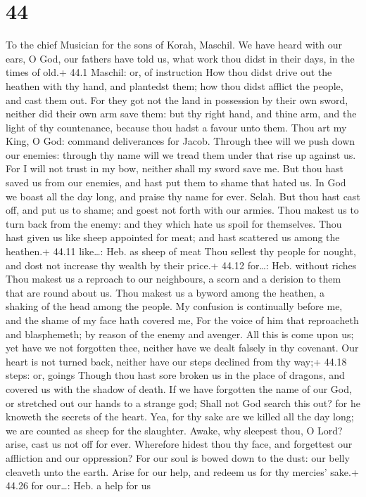 \hypertarget{section-43}{%
\section{44}\label{section-43}}

To the chief Musician for the sons of Korah, Maschil.  We
have heard with our ears, O God, our fathers have told us, what work
thou didst in their days, in the times of old.+ 44.1 Maschil: or, of
instruction  How thou didst drive out the heathen with thy
hand, and plantedst them; how thou didst afflict the people, and cast
them out.  For they got not the land in possession by their
own sword, neither did their own arm save them: but thy right hand, and
thine arm, and the light of thy countenance, because thou hadst a favour
unto them.  Thou art my King, O God: command deliverances
for Jacob.  Through thee will we push down our enemies:
through thy name will we tread them under that rise up against us.
 For I will not trust in my bow, neither shall my sword save
me.  But thou hast saved us from our enemies, and hast put
them to shame that hated us.  In God we boast all the day
long, and praise thy name for ever. Selah.  But thou hast
cast off, and put us to shame; and goest not forth with our armies.
 Thou makest us to turn back from the enemy: and they which
hate us spoil for themselves.  Thou hast given us like
sheep appointed for meat; and hast scattered us among the heathen.+
44.11 like\ldots: Heb. as sheep of meat  Thou sellest thy
people for nought, and dost not increase thy wealth by their price.+
44.12 for\ldots: Heb. without riches  Thou makest us a
reproach to our neighbours, a scorn and a derision to them that are
round about us.  Thou makest us a byword among the heathen,
a shaking of the head among the people.  My confusion is
continually before me, and the shame of my face hath covered me,
 For the voice of him that reproacheth and blasphemeth; by
reason of the enemy and avenger.  All this is come upon us;
yet have we not forgotten thee, neither have we dealt falsely in thy
covenant.  Our heart is not turned back, neither have our
steps declined from thy way;+ 44.18 steps: or, goings 
Though thou hast sore broken us in the place of dragons, and covered us
with the shadow of death.  If we have forgotten the name of
our God, or stretched out our hands to a strange god; 
Shall not God search this out? for he knoweth the secrets of the heart.
 Yea, for thy sake are we killed all the day long; we are
counted as sheep for the slaughter.  Awake, why sleepest
thou, O Lord? arise, cast us not off for ever.  Wherefore
hidest thou thy face, and forgettest our affliction and our oppression?
 For our soul is bowed down to the dust: our belly cleaveth
unto the earth.  Arise for our help, and redeem us for thy
mercies' sake.+ 44.26 for our\ldots: Heb. a help for us

